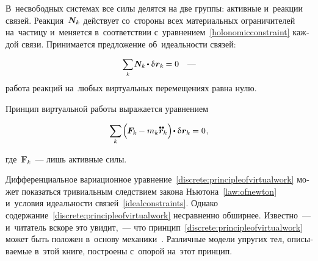 \begin{otherlanguage}{russian}
В~несвободных системах все силы делятся на две группы: активные и~реакции связей. Реакция~$\mathboldN_k$ действует со~стороны всех материальных ограничителей на~частицу  и~меняется в~соответствии с~уравнением~\eqref{holonomicconstraint} каждой связи. Принимается предложение об~идеальности связей:

\nopagebreak\begin{equation}\label{idealconstraints}
\scalebox{0.9}{$\displaystyle \sum_k$} \hspace{.2ex} \mathboldN_k \hspace{-0.2ex} \dotp \variation{\hspace{.1ex}\bm{r}_k} \hspace{-0.16ex} = 0
\quad \textrm{---}
\vspace{-0.25em}\end{equation}
\noindent работа реакций на~любых виртуальных перемещениях равна нулю.

Принцип виртуальной работы выражается уравнением

\nopagebreak\vspace{-0.1em}\begin{equation}\label{discrete:principleofvirtualwork}
\displaystyle \sum_{\smash{k}} \hspace{-0.2ex} \left(^{\mathstrut} \hspace{-0.25ex} \bm{F}_k \hspace{-0.12ex} - m_k \mathdotdotabove{\bm{r}}_k \right) \hspace{-0.32ex} \dotp \variation{\hspace{.1ex}\bm{r}_k} \hspace{-0.1ex} = 0 \hspace{0.1ex},
\vspace{-0.32em}\end{equation}

\noindent где~${\bm{F}_k}$~--- лишь активные силы.

Дифференциальное вариационное уравнение~\eqref{discrete:principleofvirtualwork} может показаться тривиальным следствием закона Ньютона~\eqref{law:ofnewton} и~условия идеальности связей~\eqref{idealconstraints}. Однако содержание~\eqref{discrete:principleofvirtualwork} несравненно обширнее. Известно~--- и~читатель вскоре это увидит,~--- что принцип~\eqref{discrete:principleofvirtualwork} может быть положен в~основу механики~\cite{gantmacher}. Различные модели упругих тел, описываемые в~этой книге, построены с~опорой на~этот принцип.


\end{otherlanguage}
